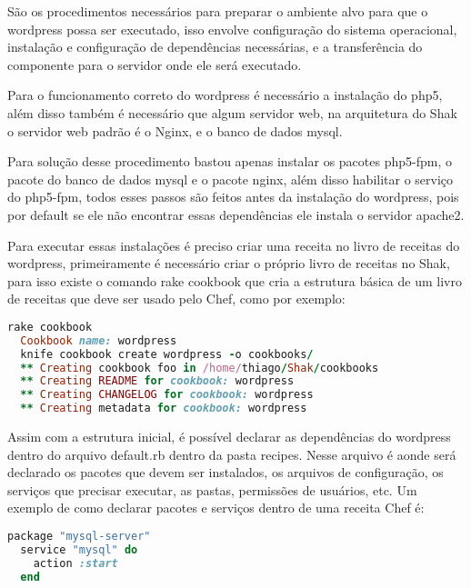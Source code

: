 São os procedimentos necessários para preparar o ambiente alvo para que o wordpress
possa ser executado, isso envolve configuração do sistema operacional, instalação
e configuração de dependências necessárias, e a transferência do componente
para o servidor onde ele será executado.

Para o funcionamento correto do wordpress é necessário a instalação do php5, além
disso também é necessário que algum servidor web, na arquitetura do Shak o servidor
web padrão é o Nginx, e o banco de dados mysql.

Para solução desse procedimento bastou apenas instalar os pacotes php5-fpm, o pacote
do banco de dados mysql e o pacote nginx, além disso habilitar o serviço do
php5-fpm, todos esses passos são feitos antes da instalação do wordpress,
pois por default se ele não encontrar essas dependências ele instala o servidor
apache2.

Para executar essas instalações é preciso criar uma receita no livro de receitas
do wordpress, primeiramente é necessário criar o próprio livro de receitas no Shak,
para isso existe o comando rake cookbook que cria a estrutura básica
de um livro de receitas que deve ser usado pelo Chef, como por exemplo:

\begin{lstlisting}[language=Ruby,label=dice_index,caption={Exemplo de criação de estrutura básica de livro de receitas do wordpress com shak}]
  rake cookbook
  Cookbook name: wordpress
  knife cookbook create wordpress -o cookbooks/
  ** Creating cookbook foo in /home/thiago/Shak/cookbooks
  ** Creating README for cookbook: wordpress
  ** Creating CHANGELOG for cookbook: wordpress
  ** Creating metadata for cookbook: wordpress
\end{lstlisting}

Assim com a estrutura inicial, é possível declarar as dependências do wordpress
dentro do arquivo default.rb dentro da pasta recipes. Nesse arquivo é aonde
será declarado os pacotes que devem ser instalados, os arquivos de configuração,
os serviços que precisar executar, as pastas, permissões de usuários, etc. Um exemplo
de como declarar pacotes e serviços dentro de uma receita Chef é:

\begin{lstlisting}[language=Ruby,label=dice_index,caption={Exemplo de criação de serviço do mysql com o chef}]
  package "mysql-server"
  service "mysql" do
    action :start
  end
\end{lstlisting}



